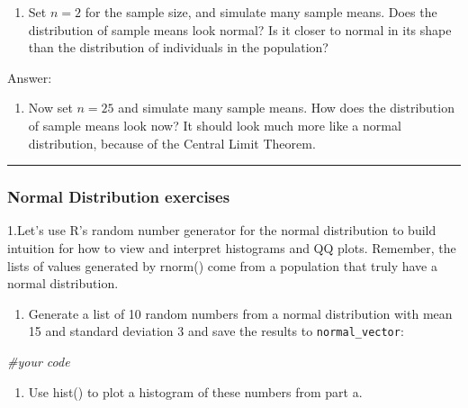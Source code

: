 \documentclass[
]{article}
\newenvironment{Shaded}{\begin{snugshade}}{\end{snugshade}}
\newcommand{\CommentTok}[1]{\textcolor[rgb]{0.56,0.35,0.01}{\textit{#1}}}
\providecommand{\tightlist}{%
  \setlength{\itemsep}{0pt}\setlength{\parskip}{0pt}}
\begin{document}
\begin{enumerate}
\def\labelenumi{\Alph{enumi})}
\setcounter{enumi}{3}
\tightlist
\item
  Set \(n=2\) for the sample size, and simulate many sample means. Does
  the distribution of sample means look normal? Is it closer to normal
  in its shape than the distribution of individuals in the population?
\end{enumerate}

Answer:

\begin{enumerate}
\def\labelenumi{\Alph{enumi})}
\setcounter{enumi}{4}
\tightlist
\item
  Now set \(n=25\) and simulate many sample means. How does the
  distribution of sample means look now? It should look much more like a
  normal distribution, because of the Central Limit Theorem.
\end{enumerate}

\begin{center}\rule{0.5\linewidth}{0.5pt}\end{center}

\hypertarget{normal-distribution-exercises}{%
\subsubsection{Normal Distribution
exercises}\label{normal-distribution-exercises}}

1.Let's use R's random number generator for the normal distribution to
build intuition for how to view and interpret histograms and QQ plots.
Remember, the lists of values generated by rnorm() come from a
population that truly have a normal distribution.

\begin{enumerate}
\def\labelenumi{\Alph{enumi})}
\tightlist
\item
  Generate a list of 10 random numbers from a normal distribution with
  mean 15 and standard deviation 3 and save the results to
  \texttt{normal\_vector}:
\end{enumerate}

\begin{Shaded}
\begin{Highlighting}[]
\CommentTok{\#your code}
\end{Highlighting}
\end{Shaded}

\begin{enumerate}
\def\labelenumi{\Alph{enumi})}
\setcounter{enumi}{1}
\tightlist
\item
  Use hist() to plot a histogram of these numbers from part a.
\end{enumerate}
\end{document}
